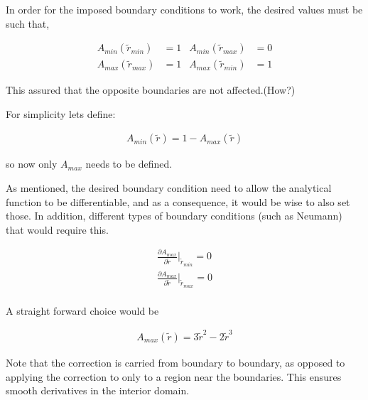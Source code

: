 \documentclass[a4paper]{article}
\begin{document}
In order for the imposed boundary conditions to work, the desired values must be 
such that,

\begin{align*}
    A_{min}(\widetilde{r}_{min}) &= 1 &A_{min}(\widetilde{r}_{max}) &= 0  \\
    A_{max}(\widetilde{r}_{max}) &= 1 &A_{max}(\widetilde{r}_{min}) &= 1 
\end{align*}

This assured that the opposite boundaries are not affected.(How?)

For simplicity lets define:

\begin{align*}
    A_{min}(\widetilde{r}) =
    1-
    A_{max}(\widetilde{r}) 
\end{align*}

so now only $A_{max}$ needs to be defined. 

As mentioned, the desired boundary condition need to allow the analytical function
to be differentiable, and as a consequence, it would be wise to also set those. 
In addition, different types of boundary conditions (such as Neumann) that would 
require this. 

\begin{align*}
    \frac{\partial A_{max} }{\partial \widetilde{r}}|_{\widetilde{r}_{min}} = 0 \\
    \frac{\partial A_{max} }{\partial \widetilde{r}}|_{\widetilde{r}_{max}} = 0 \\
\end{align*}

A straight forward choice would be 

\begin{align*}
    A_{max}(\widetilde{r}) = 
    3 \widetilde{r}^2 - 2 \widetilde{r}^3
\end{align*}

Note that the correction is carried from boundary to boundary, as opposed to 
applying the correction to only to a region near the boundaries. This ensures smooth 
derivatives in the interior domain.
\end{document}
